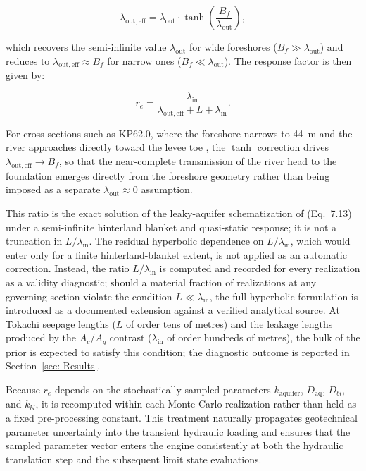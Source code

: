 $$\lambda_\mathrm{out,eff} = \lambda_\mathrm{out}\cdot\tanh\!\left(\frac{B_f}{\lambda_\mathrm{out}}\right),$$

which recovers the semi-infinite value $\lambda_\mathrm{out}$ for wide foreshores
($B_f \gg \lambda_\mathrm{out}$) and reduces to $\lambda_\mathrm{out,eff} \approx B_f$ for narrow ones ($B_f \ll \lambda_\mathrm{out}$). The response factor is then given by:

$$r_e = \frac{\lambda_\mathrm{in}}{\lambda_\mathrm{out,eff} + L + \lambda_\mathrm{in}}.$$

For cross-sections such as KP62.0, where the foreshore narrows to 44~m and the river approaches directly toward the levee toe \parencite{oyo_1999}, the $\tanh$ correction drives $\lambda_\mathrm{out,eff} \to B_f$, so that the near-complete transmission of the river head to the foundation emerges directly from the foreshore geometry rather than being imposed as a separate $\lambda_\mathrm{out} \approx 0$ assumption.

This ratio is the exact solution of the leaky-aquifer schematization of
\textcite{pol_thesis_2022} (Eq.~7.13) under a semi-infinite hinterland blanket and
quasi-static response; it is not a truncation in $L/\lambda_\mathrm{in}$. The residual hyperbolic dependence on $L/\lambda_\mathrm{in}$, which would enter only for a finite hinterland-blanket extent, is not applied as an automatic correction. Instead, the ratio $L/\lambda_\mathrm{in}$ is computed and recorded for every realization as a validity diagnostic; should a material fraction of realizations at any governing section violate the condition $L \ll \lambda_\mathrm{in}$, the full hyperbolic formulation is introduced as a documented extension against a verified analytical source. At Tokachi seepage lengths ($L$ of order tens of metres) and the leakage lengths produced by the $A_c$/$A_g$ contrast ($\lambda_\mathrm{in}$ of order hundreds of metres), the bulk of the prior is expected to satisfy this condition; the diagnostic outcome is reported in Section~\ref{sec: Results}.

Because $r_e$ depends on the stochastically sampled parameters $k_\mathrm{aquifer}$,
$D_\mathrm{aq}$, $D_{bl}$, and $k_{bl}$, it is recomputed within each Monte Carlo
realization rather than held as a fixed pre-processing constant. This treatment
naturally propagates geotechnical parameter uncertainty into the transient hydraulic
loading and ensures that the sampled parameter vector enters the engine consistently
at both the hydraulic translation step and the subsequent limit state evaluations.

